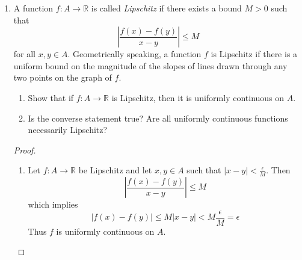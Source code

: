 \begin{enumerate}
\begin{enumerate}
        \item Prove that \( f(x) = \sqrt{x} \) is uniformly continuous on \( [0,\infty) \). 
    \end{enumerate}
    \begin{proof}
    
    \begin{enumerate}
        \item Notice that since \( f \) is continuous on \( [0,b] \) and \( [0,b] \) is compact, it follows that \( f \) is uniformly continuous on \( [0,b] \). Applying similar reasoning as in 7, we will get the desired result.
        
        \item Let \( \epsilon > 0 \) be given. To demonstrate that \( \sqrt{x} \) is uniformly continuous on \( [\epsilon^{2}, \infty) \) we let \( x,y \in [\epsilon^{2},\infty) \) such that, wlog, \( x < y \) and \( y - x < \epsilon^{2} \). Then
        \[
        \sqrt{y} - \sqrt{x} < \sqrt{x+\epsilon^{2}} - \sqrt{x} \leq \sqrt{x} + \sqrt{\epsilon^{2}} - \sqrt{x} = \epsilon
        \]
        Thus \( \sqrt{x} \) is uniformly continuous on \( [\epsilon^{2},\infty) \). Thus, by continuity of \( \sqrt{x} \), which is a trivial matter to show, and part (a), we know that \( \sqrt{x} \) is uniformly continuous on \( [0,\infty) \).
    \end{enumerate}
    
    \end{proof}
    
    \item A function \( f: A \rightarrow \mathbb{R} \) is called \emph{Lipschitz} if there exists a bound \( M > 0 \) such that
    \[
    \left| \frac{f(x)-f(y)}{x-y} \right| \leq M
    \]
    for all \( x,y \in A \). Geometrically speaking, a function \( f \) is Lipschitz if there is a uniform bound on the magnitude of the slopes of lines drawn through any two points on the graph of \( f \).
    \begin{enumerate}
        \item Show that if \( f: A \rightarrow \mathbb{R} \) is Lipschitz, then it is uniformly continuous on \( A \).
        
        \item Is the converse statement true? Are all uniformly continuous functions necessarily Lipschitz?
    \end{enumerate}
    \begin{proof}
    \begin{enumerate}
        \item Let \( f: A \rightarrow \mathbb{R} \) be Lipschitz and let \( x,y \in A \) such that \linebreak \( \vert x - y \vert < \frac{\epsilon}{M} \). Then
        \[
        \left| \frac{f(x)-f(y)}{x-y} \right| \leq M
        \]
        which implies
        \[
        \left| f(x)-f(y) \right| \leq M \vert x-y \vert < M \frac{\epsilon}{M} = \epsilon
        \]
        Thus \( f \) is uniformly continuous on \( A \). 
        

\end{enumerate}
\end{proof}
\end{enumerate}
